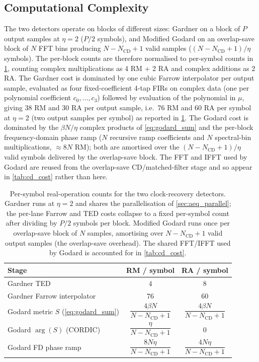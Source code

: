 \documentclass[12pt,a4paper]{report}
\begin{document}
\subsection{Computational Complexity}
The two detectors operate on blocks of different sizes: Gardner on a block of $P$ output samples at $\eta=2$ ($P/2$ symbols), and Modified Godard on an overlap-save block of $N$ FFT bins producing $N - N_\mathrm{CD} + 1$ valid samples ($(N - N_\mathrm{CD} + 1)/\eta$ symbols). The per-block counts are therefore normalised to per-symbol counts in \cref{tab:clk_cost}, counting complex multiplications as 4 RM + 2 RA and complex additions as 2 RA. The Gardner cost is dominated by one cubic Farrow interpolator per output sample, evaluated as four fixed-coefficient 4-tap FIRs on complex data (one per polynomial coefficient $c_0,\dots,c_3$) followed by evaluation of the polynomial in $\mu$, giving 38 RM and 30 RA per output sample, i.e.\ 76 RM and 60 RA per symbol at $\eta = 2$ (two output samples per symbol) as reported in \cref{tab:clk_cost}. The Godard cost is dominated by the $\beta N / \eta$ complex products of \cref{eq:godard_sum} and the per-block frequency-domain phase ramp ($N$ recursive ramp coefficients and $N$ spectral-bin multiplications, $\approx 8N$ RM); both are amortised over the $(N - N_\mathrm{CD} + 1)/\eta$ valid symbols delivered by the overlap-save block. The FFT and IFFT used by Godard are reused from the overlap-save CD/matched-filter stage and so appear in \cref{tab:cd_cost} rather than here.

\begin{table}[H]
    \centering
    \begin{tabular}{lcc}
        \toprule
        Stage & RM / symbol & RA / symbol \\
        \midrule
        Gardner TED                                       & $4$  & $8$ \\
        Gardner Farrow interpolator                       & $76$ & $60$ \\
        \midrule
        Godard metric $S$ (\cref{eq:godard_sum})          & $\dfrac{4\beta N}{N - N_\mathrm{CD} + 1}$ & $\dfrac{4\beta N}{N - N_\mathrm{CD} + 1}$ \\[8pt]
        Godard $\arg(S)$ (CORDIC)           & $\dfrac{\eta}{N - N_\mathrm{CD} + 1}$     & $0$ \\[8pt]
        Godard FD phase ramp                              & $\dfrac{8N\eta}{N - N_\mathrm{CD} + 1}$   & $\dfrac{4N\eta}{N - N_\mathrm{CD} + 1}$ \\
        \bottomrule
    \end{tabular}
    \caption{Per-symbol real-operation counts for the two clock-recovery detectors. Gardner runs at $\eta = 2$ and shares the parallelisation of \cref{sec:aeq_parallel}; the per-lane Farrow and TED costs collapse to a fixed per-symbol count after dividing by $P/2$ symbols per block. Modified Godard runs once per overlap-save block of $N$ samples, amortising over $N - N_\mathrm{CD} + 1$ valid output samples (the overlap-save overhead). The shared FFT/IFFT used by Godard is accounted for in \cref{tab:cd_cost}.}
    \label{tab:clk_cost}
\end{table}
\end{document}
